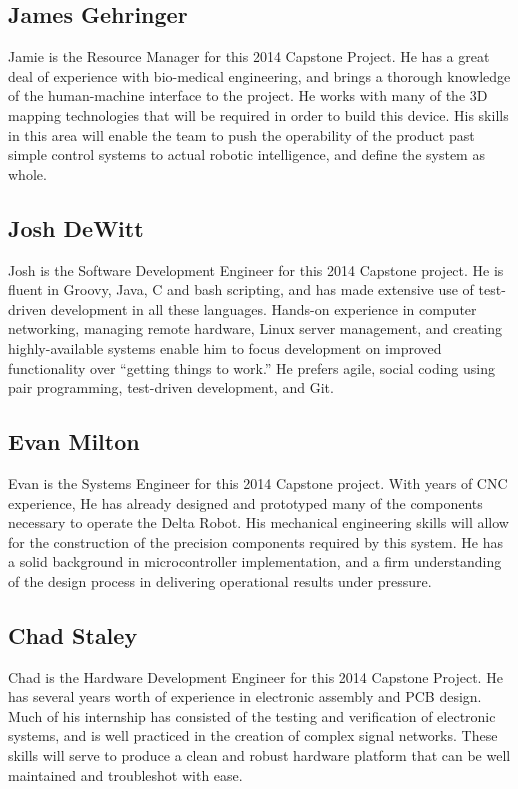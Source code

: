 \documentclass[11pt]{report}
\begin{document}
\subsection{James Gehringer}
\par Jamie is the Resource Manager for this 2014 Capstone Project. He has a great deal of experience with bio-medical engineering, and brings a thorough knowledge of the human-machine interface to the project. He works with many of the 3D mapping technologies that will be required in order to build this device. His skills in this area will enable the team to push the operability of the product past simple control systems to actual robotic intelligence, and define the system as whole.

\subsection{Josh DeWitt}
\par Josh is the Software Development Engineer for this 2014 Capstone project. He is fluent in Groovy, Java, C and bash scripting, and has made extensive use of test-driven development in all these languages. Hands-on experience in computer networking, managing remote hardware, Linux server management, and creating highly-available systems enable him to focus development on improved functionality over “getting things to work.” He prefers agile, social coding using pair programming, test-driven development, and Git. 

\subsection{Evan Milton}
\par Evan is the Systems Engineer for this 2014 Capstone project. With years of CNC experience, He has already designed and prototyped many of the components necessary to operate the Delta Robot. His mechanical engineering skills will allow for the construction of the precision components required by this system. He has a solid background in microcontroller implementation, and a firm understanding of the design process in delivering operational results under pressure.

\subsection{Chad Staley}
\par Chad is the Hardware Development Engineer for this 2014 Capstone Project. He has several years worth of experience in electronic assembly and PCB design. Much of his internship has consisted of the testing and verification of electronic systems, and is well practiced in the creation of complex signal networks. These skills will serve to produce a clean and robust hardware platform that can be well maintained and troubleshot with ease.
\end{document}
